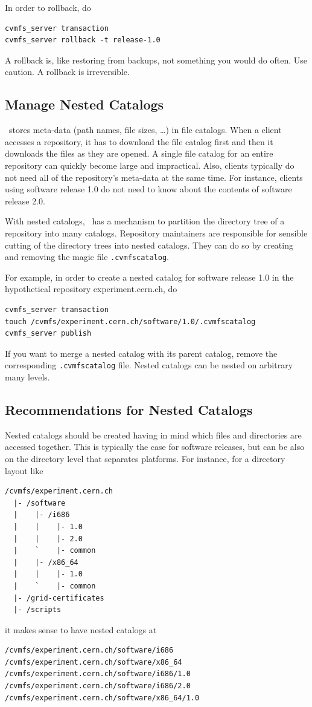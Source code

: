 In order to rollback, do
\begin{verbatim}
cvmfs_server transaction
cvmfs_server rollback -t release-1.0
\end{verbatim}

A rollback is, like restoring from backups, not something you would do often.
Use caution.
A rollback is irreversible.

\subsection{Manage Nested Catalogs}

\cvmfs\ stores meta-data (path names, file sizes, \dots) in file catalogs.
When a client accesses a repository, it has to download the file catalog first and then it downloads the files as they are opened.
A single file catalog for an entire repository can quickly become large and impractical.
Also, clients typically do not need all of the repository's meta-data at the same time.
For instance, clients using software release 1.0 do not need to know about the contents of software release 2.0.

With nested catalogs, \cvmfs\ has a mechanism to partition the directory tree of a repository into many catalogs.
Repository maintainers are responsible for sensible cutting of the directory trees into nested catalogs.
They can do so by creating and removing the magic file \texttt{.cvmfscatalog}.

For example, in order to create a nested catalog for software release 1.0 in the hypothetical repository experiment.cern.ch, do
\begin{verbatim}
cvmfs_server transaction
touch /cvmfs/experiment.cern.ch/software/1.0/.cvmfscatalog
cvmfs_server publish
\end{verbatim}

If you want to merge a nested catalog with its parent catalog, remove the corresponding \texttt{.cvmfscatalog} file.
Nested catalogs can be nested on arbitrary many levels.

\subsection{Recommendations for Nested Catalogs}
\label{sct:nestedcatalogrecommendations}
Nested catalogs should be created having in mind which files and directories are accessed together.
This is typically the case for software releases, but can be also on the directory level that separates platforms.
For instance, for a directory layout like
\begin{verbatim}
/cvmfs/experiment.cern.ch
  |- /software
  |    |- /i686
  |    |    |- 1.0
  |    |    |- 2.0
  |    `    |- common
  |    |- /x86_64
  |    |    |- 1.0
  |    `    |- common
  |- /grid-certificates
  |- /scripts
\end{verbatim}
it makes sense to have nested catalogs at
\begin{verbatim}
/cvmfs/experiment.cern.ch/software/i686
/cvmfs/experiment.cern.ch/software/x86_64
/cvmfs/experiment.cern.ch/software/i686/1.0
/cvmfs/experiment.cern.ch/software/i686/2.0
/cvmfs/experiment.cern.ch/software/x86_64/1.0
\end{verbatim}

